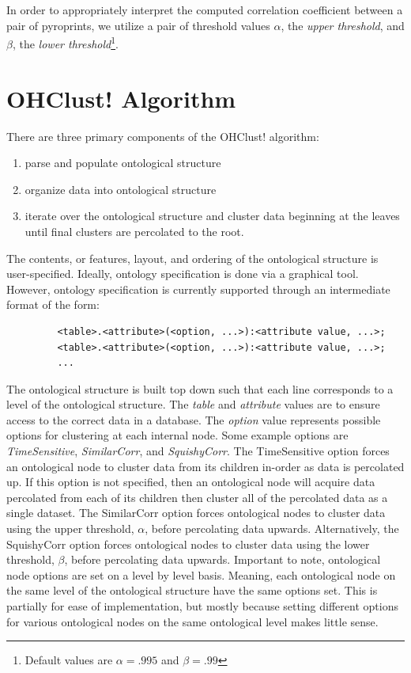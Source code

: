 \documentclass[12pt]{ucthesis}
\begin{document}
      In order to appropriately interpret the computed correlation coefficient
      between a pair of pyroprints, we utilize a pair of threshold values
      $\alpha$, the \textit{upper threshold}, and $\beta$, the \textit{lower
      threshold}\footnote{Default values are $\alpha = .995$ and $\beta =
      .99$}.

   \section{OHClust! Algorithm}\label{sec:ohclust}
      There are three primary components of the \textsf{OHClust!} algorithm:
      \begin{enumerate}
         \item parse and populate ontological structure
         \item organize data into ontological structure
         \item iterate over the ontological structure and cluster data
               beginning at the leaves until final clusters are percolated to
               the root.
      \end{enumerate}

      The contents, or features, layout, and ordering of the ontological
      structure is user-specified. Ideally, ontology specification is done via
      a graphical tool. However, ontology specification is currently supported
      through an intermediate format of the form:
      \begin{verbatim}
         <table>.<attribute>(<option, ...>):<attribute value, ...>;
         <table>.<attribute>(<option, ...>):<attribute value, ...>;
         ...
      \end{verbatim}
      The ontological structure is built top down such that each line
      corresponds to a level of the ontological structure. The \textit{table}
      and \textit{attribute} values are to ensure access to the correct data in
      a database. The \textit{option} value represents possible options for
      clustering at each internal node. Some example options are
      \textit{TimeSensitive}, \textit{SimilarCorr}, and \textit{SquishyCorr}.
      The TimeSensitive option forces an ontological node to cluster data
      from its children in-order as data is percolated up. If this option is
      not specified, then an ontological node will acquire data percolated from
      each of its children then cluster all of the percolated data as a single
      dataset. The SimilarCorr option forces ontological nodes to cluster data
      using the upper threshold, $\alpha$, before percolating data upwards.
      Alternatively, the SquishyCorr option forces ontological nodes to cluster
      data using the lower threshold, $\beta$, before percolating data upwards.
      Important to note, ontological node options are set on a level by level
      basis. Meaning, each ontological node on the same level of the
      ontological structure have the same options set. This is partially for
      ease of implementation, but mostly because setting different options for
      various ontological nodes on the same ontological level makes little
      sense.
\end{document}
